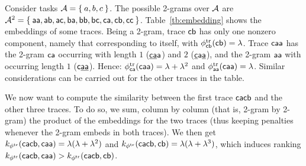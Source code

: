 \begin{example}\label{ex:wheredotiszero}
Consider tasks $\mathcal{A}=\Set{a,b,c}$. The possible 2-grams over $\mathcal{A}$ are $\mathcal{A}^2=\Set{\mathsf{aa},\mathsf{ab},\mathsf{ac},\mathsf{ba},\mathsf{bb},\mathsf{bc},\mathsf{ca},\mathsf{cb},\mathsf{cc}}$. Table~\ref{tb:embedding} shows the embeddings of some traces. Being a 2-gram, trace $\mathsf{cb}$ has only one nonzero component, namely that corresponding to itself, with $\phi^{\text{tr}}_{\mathsf{cb}}(\mathsf{cb})=\lambda$. Trace $\mathsf{caa}$ has the 2-gram $\mathsf{ca}$ occurring with length $1$ ($\mathsf{\underline{ca}a}$) and $2$ ($\mathsf{\underline{c}a\underline{a}}$), and the 2-gram $\mathsf{aa}$ with occurring length $1$ ($\mathsf{c\underline{aa}}$). Hence: $\phi^{\text{tr}}_{\mathsf{ca}}(\mathsf{caa})=\lambda+\lambda^2$ and  $\phi^{\text{tr}}_{\mathsf{aa}}(\mathsf{caa})=\lambda$.  Similar considerations can be carried out for the other traces in the table.

We now want to compute the similarity between the first trace $\mathsf{cacb}$ and the other three traces. To do so, we sum, column by column (that is, 2-gram by 2-gram) the product of the embeddings for the two traces (thus keeping penalties whenever the 2-gram embeds in both traces). We then get $k_{\phi^{\text{tr}}}(\mathsf{cacb},\mathsf{caa})=\lambda(\lambda+\lambda^2)
$ and $k_{\phi^{\text{tr}}}(\mathsf{cacb},\mathsf{cb})=\lambda(\lambda+\lambda^3)
$, 
which induces ranking $
k_{\phi^{\text{tr}}}(\mathsf{cacb},\mathsf{caa})>
k_{\phi^{\text{tr}}}(\mathsf{cacb},\mathsf{cb})
$.
\end{example}

\endinput
\subsection{Graph Embedding}\label{ssec:ge}
Graph kernels allow mapping graph data structures to feature spaces (usually an Eulcidean space in $\mathbb{R}^n$ for $n\in \mathbb{N}_{>0}$) \cite{Samatova} so to express graph similarity functions that can then be adopted for both classification \cite{TsudaS10} and clustering \cite{Raedt} algorithms. One of the first approaches used in literature involved the definition of topological description vectors \cite{Sidere} for each graph in a graph database, for then defining the graph similarity function as an inner product of their associated vectors. One inconvenience of such a technique is that it is required to perform NP-complete subgraph isomorphisms among a collection of graphs. It has been already proved that the definition of a graph kernel function fully recognising the structure the graph always boils down solving such  NP-Complete problem \cite{GartnerFW03}, as exact embeddings generable in polynomial can be inferred just for loop-free Direct Acyclic Graphs \cite{BergamiBM20}.


